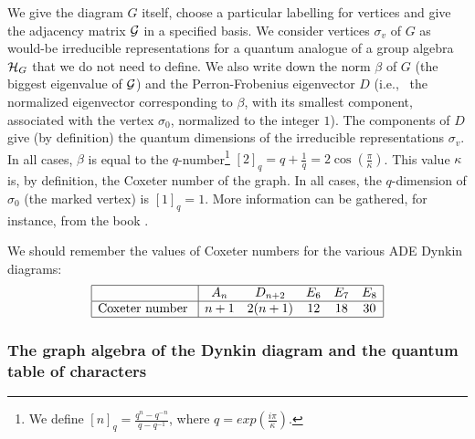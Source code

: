 \documentclass[a4paper,11pt]{article}
\def\text#1{\mbox{\rm #1\ }}
\def\ie{{\rm i.e.,\/}\ }
\begin{document}
We give the diagram $G$ itself, choose a particular labelling for vertices
and give the adjacency matrix ${\cal G}$ in a specified basis.
We consider vertices $\sigma_{v}$ of $G$
as would-be irreducible representations for a quantum analogue of a
group algebra ${\cal
H}_{G}$ that we do not need to define.
We also write down the norm $\beta$ of $G$ (the biggest
eigenvalue of ${\cal G}$) and the Perron-Frobenius eigenvector $D$ (\ie
the normalized eigenvector corresponding  to $\beta$, with its
smallest component, associated with the vertex $\sigma_0$,
normalized to the integer
$1$).
The components of $D$ give (by definition)
the quantum dimensions  of the
irreducible representations $\sigma_{v}$.
In all cases, $\beta$ is equal to the $q$-number\footnote{We define
$[n]_{q}=\frac{q^n - q^{-n}}{q - q^{-1}}$, where $q=exp(\frac{i\pi}{\kappa})$.}
$[2]_{q} = q + \frac{1}{q} = 2 \cos(\frac{\pi}{\kappa})$.
This value $\kappa$ is, by  definition, the Coxeter number of the graph.
In all cases, the $q$-dimension of $\sigma_{0}$ (the marked vertex) is
$[1]_{q}=1$.
More information can be gathered, for instance, from the book \cite{FMS:book}.

We should remember the values of Coxeter numbers for the various ADE
Dynkin diagrams:
$$\begin{array}{|c|ccccc|}
\hline
{} & A_n & D_{n+2} & E_6 & E_7 & E_8 \\
\hline
\text{Coxeter number} & n+1 & 2(n+1) & 12 & 18 & 30 \\
\hline
\end{array}
$$

\subsubsection{The graph algebra of the Dynkin diagram and the quantum table of
characters}
\end{document}
